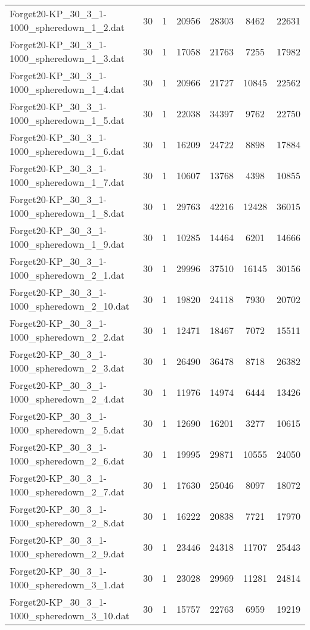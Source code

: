 \begin{table}[!ht]
\begin{tabular}{lcccccc}
Forget20-KP\_30\_3\_1-1000\_spheredown\_1\_2.dat & 30 & 1 & 20956 & 28303 & 8462 & 22631 \\
Forget20-KP\_30\_3\_1-1000\_spheredown\_1\_3.dat & 30 & 1 & 17058 & 21763 & 7255 & 17982 \\
Forget20-KP\_30\_3\_1-1000\_spheredown\_1\_4.dat & 30 & 1 & 20966 & 21727 & 10845 & 22562 \\
Forget20-KP\_30\_3\_1-1000\_spheredown\_1\_5.dat & 30 & 1 & 22038 & 34397 & 9762 & 22750 \\
Forget20-KP\_30\_3\_1-1000\_spheredown\_1\_6.dat & 30 & 1 & 16209 & 24722 & 8898 & 17884 \\
Forget20-KP\_30\_3\_1-1000\_spheredown\_1\_7.dat & 30 & 1 & 10607 & 13768 & 4398 & 10855 \\
Forget20-KP\_30\_3\_1-1000\_spheredown\_1\_8.dat & 30 & 1 & 29763 & 42216 & 12428 & 36015 \\
Forget20-KP\_30\_3\_1-1000\_spheredown\_1\_9.dat & 30 & 1 & 10285 & 14464 & 6201 & 14666 \\
Forget20-KP\_30\_3\_1-1000\_spheredown\_2\_1.dat & 30 & 1 & 29996 & 37510 & 16145 & 30156 \\
Forget20-KP\_30\_3\_1-1000\_spheredown\_2\_10.dat & 30 & 1 & 19820 & 24118 & 7930 & 20702 \\
Forget20-KP\_30\_3\_1-1000\_spheredown\_2\_2.dat & 30 & 1 & 12471 & 18467 & 7072 & 15511 \\
Forget20-KP\_30\_3\_1-1000\_spheredown\_2\_3.dat & 30 & 1 & 26490 & 36478 & 8718 & 26382 \\
Forget20-KP\_30\_3\_1-1000\_spheredown\_2\_4.dat & 30 & 1 & 11976 & 14974 & 6444 & 13426 \\
Forget20-KP\_30\_3\_1-1000\_spheredown\_2\_5.dat & 30 & 1 & 12690 & 16201 & 3277 & 10615 \\
Forget20-KP\_30\_3\_1-1000\_spheredown\_2\_6.dat & 30 & 1 & 19995 & 29871 & 10555 & 24050 \\
Forget20-KP\_30\_3\_1-1000\_spheredown\_2\_7.dat & 30 & 1 & 17630 & 25046 & 8097 & 18072 \\
Forget20-KP\_30\_3\_1-1000\_spheredown\_2\_8.dat & 30 & 1 & 16222 & 20838 & 7721 & 17970 \\
Forget20-KP\_30\_3\_1-1000\_spheredown\_2\_9.dat & 30 & 1 & 23446 & 24318 & 11707 & 25443 \\
Forget20-KP\_30\_3\_1-1000\_spheredown\_3\_1.dat & 30 & 1 & 23028 & 29969 & 11281 & 24814 \\
Forget20-KP\_30\_3\_1-1000\_spheredown\_3\_10.dat & 30 & 1 & 15757 & 22763 & 6959 & 19219 \\

\end{tabular}
\end{table}
